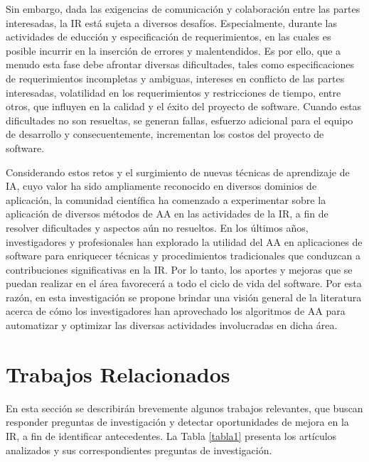 \documentclass[journal]{IEEEtran}
\begin{document}
Sin embargo, dada las exigencias de comunicación y colaboración entre las partes interesadas, la IR está sujeta a diversos desafíos. Especialmente, durante las actividades de educción y especificación de requerimientos, en las cuales es posible incurrir en la inserción de errores y malentendidos. Es por ello, que a menudo esta fase debe afrontar diversas dificultades, tales como especificaciones de requerimientos incompletas y ambiguas, intereses en conflicto de las partes interesadas, volatilidad en los requerimientos y restricciones de tiempo, entre otros, que influyen en la calidad y el éxito del proyecto de software. Cuando estas dificultades no son resueltas, se generan fallas, esfuerzo adicional para el equipo de desarrollo y consecuentemente, incrementan los costos del proyecto de software. 

Considerando estos retos y el surgimiento de nuevas técnicas de aprendizaje de IA, cuyo valor ha sido ampliamente reconocido en diversos dominios de aplicación, la comunidad científica ha comenzado a experimentar sobre la aplicación de diversos métodos de AA en las actividades de la IR, a fin de resolver dificultades y aspectos aún no resueltos. En los últimos años, investigadores y profesionales han explorado la utilidad del AA en aplicaciones de software para enriquecer técnicas y procedimientos tradicionales que conduzcan a contribuciones significativas en la IR. Por lo tanto, los aportes y mejoras que se puedan realizar en el área favorecerá a todo el ciclo de vida del software. Por esta razón, en esta investigación se propone brindar una visión general de la literatura acerca de cómo los investigadores han aprovechado los algoritmos de AA para automatizar y optimizar las diversas actividades involucradas en dicha área.

\section{Trabajos Relacionados}
En esta sección se describirán brevemente algunos trabajos relevantes, que buscan responder preguntas de investigación y detectar oportunidades de mejora en la IR, a fin de identificar antecedentes. La Tabla \ref{tabla1} presenta los artículos analizados y sus correspondientes preguntas de investigación.
\end{document}
